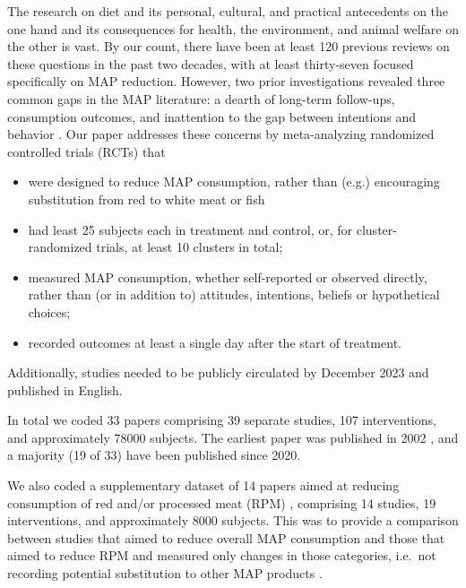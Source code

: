 \documentclass[sn-nature,pdflatex]{sn-jnl}
\begin{document}
The research on diet and its personal, cultural, and practical
antecedents on the one hand and its consequences for health, the
environment, and animal welfare on the other is vast. By our count,
there have been at least 120 previous reviews on these questions in the
past two decades, with at least thirty-seven focused specifically on MAP
reduction. However, two prior investigations revealed three common gaps
in the MAP literature: a dearth of long-term follow-ups, consumption
outcomes, and inattention to the gap between intentions and behavior
\citep{mathur2021meta, mathur2021effectiveness}. Our paper addresses
these concerns by meta-analyzing randomized controlled trials (RCTs)
that

\begin{itemize}
\item
  were designed to reduce MAP consumption, rather than (e.g.)
  encouraging substitution from red to white meat or fish
\item
  had least 25 subjects each in treatment and control, or, for
  cluster-randomized trials, at least 10 clusters in total;
\item
  measured MAP consumption, whether self-reported or observed directly,
  rather than (or in addition to) attitudes, intentions, beliefs or
  hypothetical choices;
\item
  recorded outcomes at least a single day after the start of treatment.
\end{itemize}

Additionally, studies needed to be publicly circulated by December 2023
and published in English.

In total we coded 33 papers
\citep{abrahamse2007, alblas2023, aldoh2023, allen2002, andersson2021, acharya2004, berndsen2005, bertolaso2015, bianchi2022, bochmann2017, bschaden2020, carfora2023, coker2022, cooney2016, fehrenbach2015, feltz2022, griesoph2021, haile2021, hatami2018, hennessy2016, jalil2023, lacroix2020, mathur2021effectiveness, mattson2020, merrill2009, norris2014, peacock2017, piester2020, polanco2022, sparkman2017, sparkman2020, sparkman2021, weingarten2022}
comprising 39 separate studies, 107 interventions, and approximately
78000 subjects. The earliest paper was published in 2002
\citep[@][]{allen2002}, and a majority (19 of 33) have been published
since 2020.

We also coded a supplementary dataset of 14 papers aimed at reducing
consumption of red and/or processed meat (RPM)
\citep{carfora2017correlational, carfora2017randomised, carfora2019, carfora2019informational, delichatsios2001, dijkstra2022, emmons2005cancer, emmons2005project, jaacks2014, james2015, lee2018, perino2022, schatzkin2000, sorensen2005},
comprising 14 studies, 19 interventions, and approximately 8000
subjects. This was to provide a comparison between studies that aimed to
reduce overall MAP consumption and those that aimed to reduce RPM and
measured only changes in those categories, i.e.~not recording potential
substitution to other MAP products \citep{mathur2022ethical}.
\end{document}
